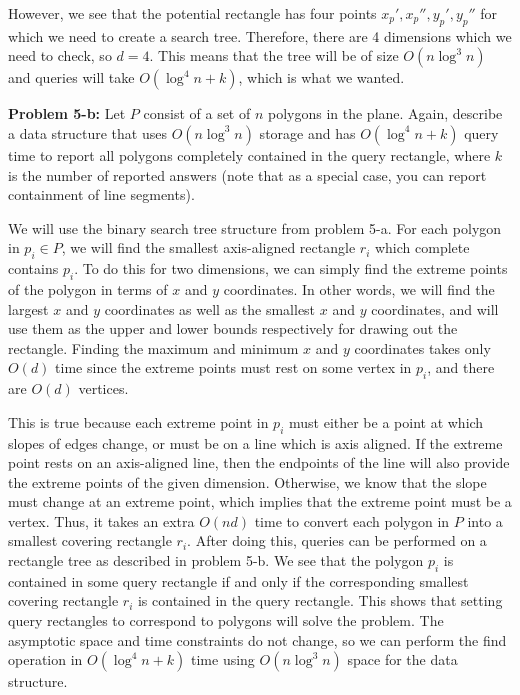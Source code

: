 \documentclass[psamsfonts]{amsart}
\newenvironment{sol}{\vspace{0.25cm}{\large \bfseries Solution:}}{\qedsymbol}
\newenvironment{prob}[1]{\begin{framed}{\large \bfseries Problem #1:}}{\end{framed}}
\begin{document}
\begin{sol}
However, we see that the potential rectangle has four points $x_p', x_p'', y_p', y_p''$ for which we need to create a search tree. Therefore, there are 4 dimensions which we need to check, so $d = 4$. This means that the tree will be of size $O(n \log^3 n)$ and queries will take $O(\log^4 n + k)$, which is what we wanted.
\end{sol}

\begin{prob}{5-b}
Let $P$ consist of a set of $n$ polygons in the plane. Again, describe a data structure that uses $O(n \log^3 n)$ storage and has $O(\log^4 n + k)$ query time to report all polygons completely contained in the query rectangle, where $k$ is the number of reported answers (note that as a special case, you can report containment of line segments).
\end{prob}
\begin{sol}
We will use the binary search tree structure from problem 5-a. For each polygon in $p_i \in P$, we will find the smallest axis-aligned rectangle $r_i$ which complete contains $p_i$. To do this for two dimensions, we can simply find the extreme points of the polygon in terms of $x$ and $y$ coordinates. In other words, we will find the largest $x$ and $y$ coordinates as well as the smallest $x$ and $y$ coordinates, and will use them as the upper and lower bounds respectively for drawing out the rectangle. Finding the maximum and minimum $x$ and $y$ coordinates takes only $O(d)$ time since the extreme points must rest on some vertex in $p_i$, and there are $O(d)$ vertices.

This is true because each extreme point in $p_i$ must either be a point at which slopes of edges change, or must be on a line which is axis aligned. If the extreme point rests on an axis-aligned line, then the endpoints of the line will also provide the extreme points of the given dimension. Otherwise, we know that the slope must change at an extreme point, which implies that the extreme point must be a vertex. Thus, it takes an extra $O(nd)$ time to convert each polygon in $P$ into a smallest covering rectangle $r_i$. After doing this, queries can be performed on a rectangle tree as described in problem 5-b. We see that the polygon $p_i$ is contained in some query rectangle if and only if the corresponding smallest covering rectangle $r_i$ is contained in the query rectangle. This shows that setting query rectangles to correspond to polygons will solve the problem. The asymptotic space and time constraints do not change, so we can perform the find operation in $O(\log^4 n + k)$ time using $O(n \log^3 n)$ space for the data structure.
\end{sol}
\end{document}
